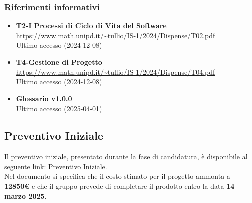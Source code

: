 \subsubsection{Riferimenti informativi}
\begin{itemize}
    \item \textbf{T2-I Processi di Ciclo di Vita del Software} \\
    \url{https://www.math.unipd.it/~tullio/IS-1/2024/Dispense/T02.pdf}\\
        Ultimo accesso (2024-12-08)
    \item \textbf{T4-Gestione di Progetto} \\
    \url{https://www.math.unipd.it/~tullio/IS-1/2024/Dispense/T04.pdf}\\
        Ultimo accesso (2024-12-08)
    \item \textbf{Glossario v1.0.0} \\
        Ultimo accesso (2025-04-01)
\end{itemize}


\subsection{Preventivo Iniziale}
Il preventivo iniziale, presentato durante la fase di candidatura, è disponibile al seguente link: \href{https://pebkac-swe-group-11.github.io/assets/pdf/Preventivo_Costi_Assunzione_Impegni_V2.0.0.pdf}{Preventivo Iniziale}.\\Nel documento si specifica che il costo stimato per il progetto ammonta a \textbf{12850€} e che il gruppo prevede di completare il prodotto entro la data \textbf{14 marzo 2025}.